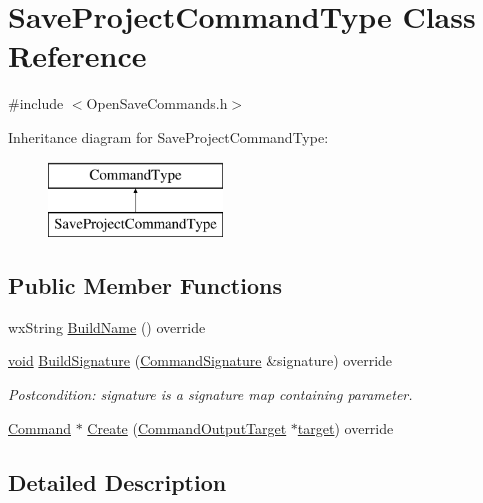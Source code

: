 \hypertarget{class_save_project_command_type}{}\section{Save\+Project\+Command\+Type Class Reference}
\label{class_save_project_command_type}


{\ttfamily \#include $<$Open\+Save\+Commands.\+h$>$}

Inheritance diagram for Save\+Project\+Command\+Type\+:\begin{figure}[H]
\begin{center}
\leavevmode
\includegraphics[height=2.000000cm]{class_save_project_command_type}
\end{center}
\end{figure}
\subsection*{Public Member Functions}
\begin{DoxyCompactItemize}
\item 
wx\+String \hyperlink{class_save_project_command_type_ade837c8956a10325fac4b583eb48084a}{Build\+Name} () override
\item 
\hyperlink{sound_8c_ae35f5844602719cf66324f4de2a658b3}{void} \hyperlink{class_save_project_command_type_a6001ac271480e903879e6e1f7e45cf39}{Build\+Signature} (\hyperlink{class_command_signature}{Command\+Signature} \&signature) override
\begin{DoxyCompactList}\small\item\em Postcondition\+: signature is a \textquotesingle{}signature\textquotesingle{} map containing parameter. \end{DoxyCompactList}\item 
\hyperlink{class_command}{Command} $\ast$ \hyperlink{class_save_project_command_type_ab42ad9b79ff99d393cf4b935e0a1e5b1}{Create} (\hyperlink{class_command_output_target}{Command\+Output\+Target} $\ast$\hyperlink{lib_2expat_8h_a15a257516a87decb971420e718853137}{target}) override
\end{DoxyCompactItemize}


\subsection{Detailed Description}


